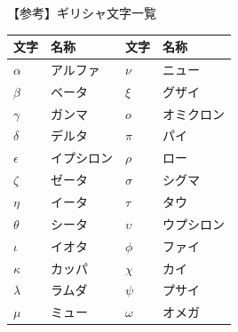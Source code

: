 \documentclass[dvipdfmx,aspectratio=169]{beamer}
\begin{document}
	\begin{frame}{【参考】ギリシャ文字一覧}
		\begin{table}[]
			\begin{tabular}{ll|ll}
				\toprule
				文字         & 名称    & 文字         & 名称    \\
				\midrule
				$\alpha$   & アルファ  & $\nu$      & ニュー   \\
				$\beta$    & ベータ   & $\xi$      & グザイ   \\
				$\gamma$   & ガンマ   & $o$        & オミクロン \\
				$\delta$   & デルタ   & $\pi$      & パイ    \\
				$\epsilon$ & イプシロン & $\rho$     & ロー    \\
				$\zeta$    & ゼータ   & $\sigma$   & シグマ   \\
				$\eta$     & イータ   & $\tau$     & タウ    \\
				$\theta$   & シータ   & $\upsilon$ & ウプシロン \\
				$\iota$     & イオタ   & $\phi$     & ファイ   \\
				$\kappa$   & カッパ   & $\chi$     & カイ    \\
				$\lambda$  & ラムダ   & $\psi$     & プサイ   \\
				$\mu$      & ミュー   & $\omega$   & オメガ  \\
				\bottomrule
			\end{tabular}
		\end{table}
	\end{frame}
\end{document}
